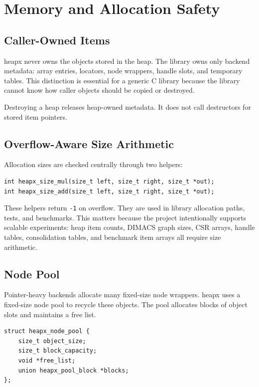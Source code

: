 \chapter{Memory and Allocation Safety}

\section{Caller-Owned Items}

heapx never owns the objects stored in the heap.
The library owns only backend metadata: array entries, locators, node wrappers, handle slots, and temporary tables.
This distinction is essential for a generic C library because the library cannot know how caller objects should be copied or destroyed.

Destroying a heap releases heap-owned metadata.
It does not call destructors for stored item pointers.

\section{Overflow-Aware Size Arithmetic}

Allocation sizes are checked centrally through two helpers:

\begin{lstlisting}[style=cstyle, caption={Centralized size arithmetic helpers.}]
int heapx_size_mul(size_t left, size_t right, size_t *out);
int heapx_size_add(size_t left, size_t right, size_t *out);
\end{lstlisting}

These helpers return \texttt{-1} on overflow.
They are used in library allocation paths, tests, and benchmarks.
This matters because the project intentionally supports scalable experiments: heap item counts, DIMACS graph sizes, CSR arrays, handle tables, consolidation tables, and benchmark item arrays all require size arithmetic.

\section{Node Pool}

Pointer-heavy backends allocate many fixed-size node wrappers.
heapx uses a fixed-size node pool to recycle these objects.
The pool allocates blocks of object slots and maintains a free list.

\begin{lstlisting}[style=cstyle, caption={Node pool state.}]
struct heapx_node_pool {
    size_t object_size;
    size_t block_capacity;
    void *free_list;
    union heapx_pool_block *blocks;
};
\end{lstlisting}

